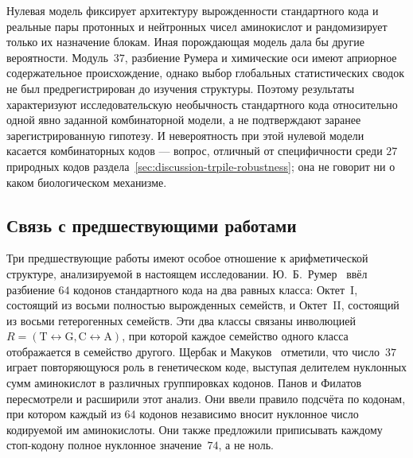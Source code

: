 \documentclass[11pt,a4paper]{article}
\renewcommand{\_}{\origunderscore\allowbreak}
\begin{document}
Нулевая модель фиксирует архитектуру вырожденности стандартного
кода и реальные пары протонных и нейтронных чисел аминокислот и
рандомизирует только их назначение блокам. Иная порождающая модель
дала бы другие вероятности. Модуль~$37$, разбиение Румера и
химические оси имеют априорное содержательное происхождение,
однако выбор глобальных статистических сводок не был
предрегистрирован до изучения структуры. Поэтому результаты
характеризуют исследовательскую необычность стандартного кода
относительно одной явно заданной комбинаторной модели, а не
подтверждают заранее зарегистрированную гипотезу.
И невероятность при этой нулевой модели касается комбинаторных
кодов --- вопрос, отличный от специфичности среди $27$ природных
кодов раздела~\ref{sec:discussion-trpile-robustness}; она не
говорит ни о каком биологическом механизме.

\subsection{Связь с предшествующими работами}
\label{sec:discussion-prior-work}

Три предшествующие работы имеют особое отношение к
арифметической структуре, анализируемой в настоящем
исследовании. Ю.~Б.~Румер~\cite{rumer1966,rumer1968}
ввёл разбиение $64$ кодонов стандартного кода на
два равных класса: Октет~I,
состоящий из восьми полностью вырожденных семейств, и
Октет~II, состоящий из восьми
гетерогенных семейств. Эти два классы связаны
инволюцией
$R = (\mathrm{T} \leftrightarrow \mathrm{G},
\mathrm{C} \leftrightarrow \mathrm{A})$, при которой
каждое семейство одного класса отображается в
семейство другого. Щербак и Макуков~\cite{makukov2013}
отметили, что число~$37$ играет повторяющуюся роль
в генетическом коде, выступая делителем нуклонных сумм
аминокислот в различных группировках кодонов. Панов и
Филатов~\cite{panov2024} пересмотрели и расширили
этот анализ. Они ввели правило подсчёта по кодонам,
при котором каждый из $64$ кодонов независимо
вносит нуклонное число кодируемой им аминокислоты.
Они также предложили приписывать каждому
стоп-кодону полное нуклонное значение~$74$,
а не ноль.
\end{document}
